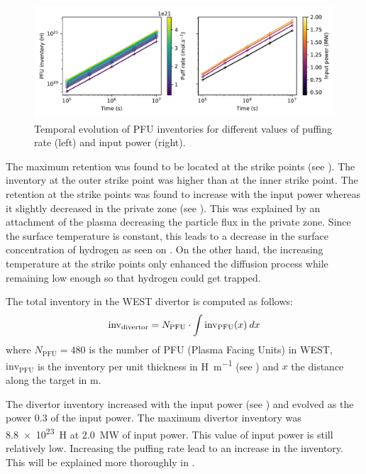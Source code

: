 \begin{figure}[h]
    \centering
    \includegraphics[width=0.8\linewidth]{Figures/Chapter4/WEST/inventory_vs_time_west.pdf}
    \caption{Temporal evolution of PFU inventories for different values of puffing rate (left) and input power (right).}
\end{figure}

The maximum retention was found to be located at the strike points (see ).
The inventory at the outer strike point was higher than at the inner strike point.
The retention at the strike points was found to increase with the input power whereas it slightly decreased in the private zone (see ).
This was explained by an attachment of the plasma decreasing the particle flux in the private zone.
Since the surface temperature is constant, this leads to a decrease in the surface concentration of hydrogen as seen on .
On the other hand, the increasing temperature at the strike points only enhanced the diffusion process while remaining low enough so that hydrogen could get trapped.

The total inventory in the WEST divertor is computed as follows:
\begin{equation}
    \mathrm{inv}_\mathrm{divertor} = N_\mathrm{PFU} \cdot \int \mathrm{inv}_\mathrm{PFU}(x)\: dx
    \labeq{inventory WEST}
\end{equation}
where $N_\mathrm{PFU} = 480$ is the number of PFU (Plasma Facing Units) in WEST, $\mathrm{inv}_\mathrm{PFU}$ is the inventory per unit thickness in \si{H.m^{-1}} (see ) and $x$ the distance along the target in \si{m}.

The divertor inventory increased with the input power (see ) and evolved as the power 0.3 of the input power.
The maximum divertor inventory was \SI{8.8e23}{H} at \SI{2.0}{MW} of input power.
This value of input power is still relatively low.
Increasing the puffing rate lead to an increase in the inventory.
This will be explained more thoroughly in .

